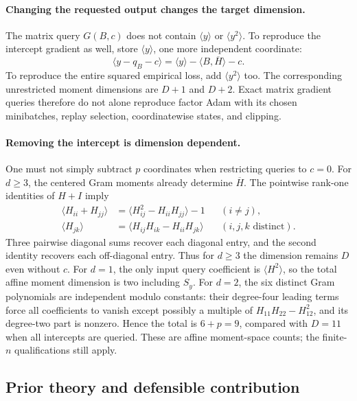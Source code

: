 \paragraph{Changing the requested output changes the target dimension.}
The matrix query $G(B,c)$ does not contain $\langle y\rangle$ or
$\langle y^2\rangle$. To reproduce the intercept gradient as well,
store $\langle y\rangle$, one more independent coordinate:
\[
 \langle y-q_B-c\rangle
 =\langle y\rangle-\langle B,\overline H\rangle-c.
\]
To reproduce the entire squared empirical loss, add
$\langle y^2\rangle$ too. The corresponding unrestricted moment
dimensions are $D+1$ and $D+2$. Exact matrix gradient queries
therefore do not alone reproduce factor Adam with its chosen
minibatches, replay selection, coordinatewise states, and clipping.

\paragraph{Removing the intercept is dimension dependent.}
One must not simply subtract $p$ coordinates when restricting queries
to $c=0$. For $d\ge3$, the centered Gram moments already determine
$\overline H$. The pointwise rank-one identities of $H+I$ imply
\begin{align*}
 \langle H_{ii}+H_{jj}\rangle
    &=\langle H_{ij}^2-H_{ii}H_{jj}\rangle-1
            &&(i\ne j),\\
 \langle H_{jk}\rangle
    &=\langle H_{ij}H_{ik}-H_{ii}H_{jk}\rangle
            &&(i,j,k\text{ distinct}).
\end{align*}
Three pairwise diagonal sums recover each diagonal entry, and the
second identity recovers each off-diagonal entry. Thus for $d\ge3$
the dimension remains $D$ even without $c$. For $d=1$, the only
input query coefficient is $\langle H^2\rangle$, so the total affine
moment dimension is two including $S_y$. For $d=2$, the six distinct
Gram polynomials are independent modulo constants: their degree-four
leading terms force all coefficients to vanish except possibly a
multiple of $H_{11}H_{22}-H_{12}^2$, and its degree-two part is
nonzero. Hence the total is $6+p=9$, compared with $D=11$ when all
intercepts are queried. These are affine moment-space counts; the
finite-$n$ qualifications still apply.

\subsection{Prior theory and defensible contribution}

